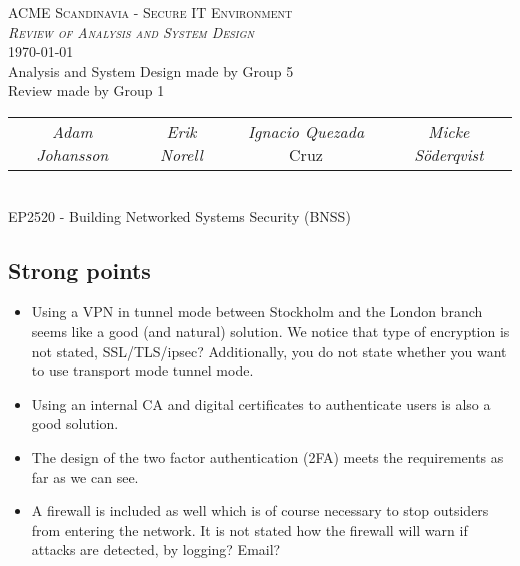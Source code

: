 \documentclass[a4paper,11pt,oneside]{article}
\begin{document}

\begin{center}
    \textsc{\large ACME Scandinavia - Secure IT Environment}\\
    \vspace{5pt}
    \textsc{\large\textit{Review of Analysis and System Design}}\\
    \vspace{5pt}
    \footnotesize{\today}\\
    \vspace{10pt}
    \small{Analysis and System Design made by Group 5}\\
    \vspace{5pt}
    \small{Review made by Group 1}\\
    \vspace{5pt}
    \begin{tabular}{ c c c c }
        \small{\textit{Adam Johansson}} & \small{\textit{Erik Norell}} & \small{\textit{Ignacio Quezada}} Cruz & \small{\textit{Micke Söderqvist}} \\
    \end{tabular}\\
    \vspace{5pt}
    \footnotesize{EP2520 - Building Networked Systems Security (BNSS)}\\
\end{center}

\subsection*{Strong points}
\begin{itemize}
    \item Using a VPN in tunnel mode between Stockholm and the London branch seems like a good (and natural) solution. We notice that type of encryption is not stated, SSL/TLS/ipsec? Additionally, you do not state whether you want to use transport mode tunnel mode.
    \item Using an internal CA and digital certificates to authenticate users is also a good solution.
    \item The design of the two factor authentication (2FA) meets the requirements as far as we can see.
    \item A firewall is included as well which is of course necessary to stop outsiders from entering the network. It is not stated how the firewall will warn if attacks are detected, by logging? Email?
\end{itemize}
\end{document}
